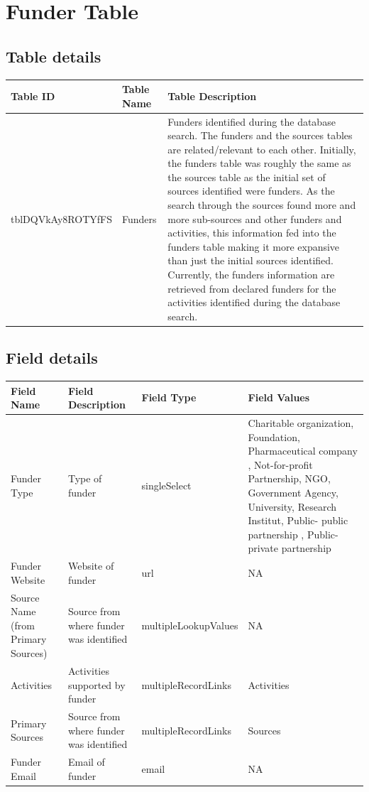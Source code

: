 \documentclass[
]{book}
\begin{document}
\hypertarget{funders-table}{%
\section{Funder Table}\label{funders-table}}

\hypertarget{table-details-4}{%
\subsection{Table details}\label{table-details-4}}

\begin{table}
\centering
\begin{tabular}{l|l|l}
\hline
\textbf{Table ID} & \textbf{Table Name} & \textbf{Table Description}\\
\hline
tblDQVkAy8ROTYfFS & Funders & Funders identified during the database search. The funders and the sources tables are related/relevant to each other. Initially, the funders table was roughly the same as the sources table as the initial set of sources identified were funders. As the search through the sources found more and more sub-sources and other funders and activities, this information fed into the funders table making it more expansive than just the initial sources identified. Currently, the funders information are retrieved from declared funders for the activities identified during the database search.\\
\hline
\end{tabular}
\end{table}

\hypertarget{field-details-1}{%
\subsection{Field details}\label{field-details-1}}

\begin{table}
\centering
\begin{tabular}{l|l|l|l}
\hline
\textbf{Field Name} & \textbf{Field Description} & \textbf{Field Type} & \textbf{Field Values}\\
\hline
Funder Type & Type of funder & singleSelect & Charitable organization, Foundation, Pharmaceutical company , Not-for-profit Partnership, NGO, Government Agency, University, Research Institut, Public- public partnership , Public-private partnership\\
\hline
Funder Website & Website of funder & url & NA\\
\hline
Source Name (from Primary Sources) & Source from where funder was identified & multipleLookupValues & NA\\
\hline
Activities & Activities supported by funder & multipleRecordLinks & Activities\\
\hline
Primary Sources & Source from where funder was identified & multipleRecordLinks & Sources\\
\hline
Funder Email & Email of funder & email & NA\\
\hline
\end{tabular}
\end{table}
\end{document}
